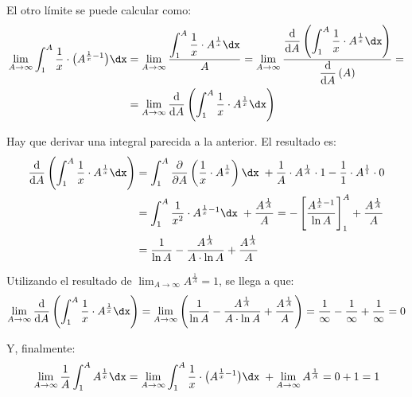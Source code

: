\documentclass[../../main.tex]{subfiles}
\begin{document}
  El otro límite se puede calcular como:
  \begin{equation*}
    \begin{split}
      \lim_{A \to \infty} \int_1^A \frac{1}{x} \cdot \big(A^{\frac{1}{x} - 1}\big) \dx & =
      \lim_{A \to \infty} \frac{\displaystyle\int_1^A \frac{1}{x} \cdot A^\frac{1}{x} \dx}{A}
      = \lim_{A \to \infty} \frac{\displaystyle\frac{\text{d}}{\text{d}A}\left(\displaystyle\int_1^A \frac{1}{x} \cdot A^\frac{1}{x} \dx\right)}{\displaystyle\frac{\text{d}}{\text{d}A}\left(A\right)} = \\ & =
      \lim_{A \to \infty} \displaystyle\frac{\text{d}}{\text{d}A}\left(\displaystyle\int_1^A \frac{1}{x} \cdot A^\frac{1}{x} \dx\right)
    \end{split}
  \end{equation*}

  Hay que derivar una integral parecida a la anterior. El resultado es:
  \begin{equation*}
    \begin{split}
      \frac{\text{d}}{\text{d}A}\left(\displaystyle\int_1^A \frac{1}{x} \cdot A^\frac{1}{x} \dx\right) & =
      \int_1^A \frac{\partial}{\partial A}\left(\frac{1}{x} \cdot A^\frac{1}{x}\right) \dx \; + \frac{1}{A} \cdot A^\frac{1}{A} \cdot 1 - \frac{1}{1} \cdot A^\frac{1}{1} \cdot 0 \\ & =
      \int_1^A \frac{1}{x^2} \cdot A^{\frac{1}{x} - 1} \dx \; + \frac{A^\frac{1}{A}}{A} = - \left[\frac{A^{\frac{1}{x} - 1}}{\ln A}\right]_1^A + \frac{A^\frac{1}{A}}{A} \\ & =
      \frac{1}{\ln A} - \frac{A^\frac{1}{A}}{A \cdot \ln A} + \frac{A^\frac{1}{A}}{A}
    \end{split}
  \end{equation*}

  Utilizando el resultado de $\displaystyle\lim_{A \to \infty} A^\frac{1}{A} = 1$, se llega a que:
  $$
  \lim_{A \to \infty} \frac{\text{d}}{\text{d}A}\left(\displaystyle\int_1^A \frac{1}{x} \cdot A^\frac{1}{x} \dx\right) = \lim_{A \to \infty} \left(\frac{1}{\ln A} - \frac{A^\frac{1}{A}}{A \cdot \ln A} + \frac{A^\frac{1}{A}}{A} \right) = \frac{1}{\infty} - \frac{1}{\infty} + \frac{1}{\infty} = 0
  $$

  Y, finalmente:
  $$
  \lim_{A \to \infty} \frac{1}{A} \int_1^A A^\frac{1}{x} \dx =
  \lim_{A \to \infty} \int_1^A \frac{1}{x} \cdot \big(A^{\frac{1}{x} - 1}\big) \dx \; + \lim_{A \to \infty} A^\frac{1}{A} = 0 + 1 = 1
  $$
\end{document}
